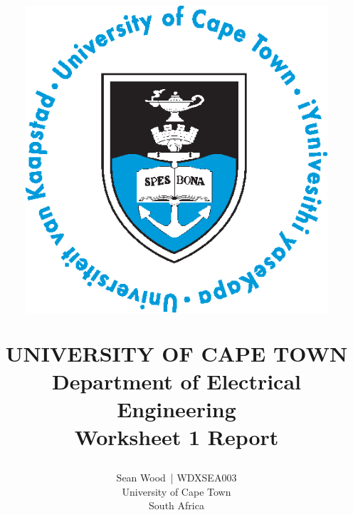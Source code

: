 

\newcommand{\mainauthor}{Sean Wood}
\newcommand{\mainauthoradditional}{WDXSEA003}
\newcommand{\reporttitle}{Worksheet 1 Report}
\newcommand{\coursecode}{EEE4096F}

\title{%
  \begin{figure}[H]
    \vspace{2cm}
    \begin{center}
      \includegraphics[width=0.4\columnwidth]{Preamble/uct-logo}
    \end{center}
  \end{figure}
  \textmd{\Huge UNIVERSITY OF CAPE TOWN \\ \LARGE Department of Electrical Engineering} \\
  \vspace{3cm}
  \reporttitle
}

\author{%
  \mainauthor\ | \mainauthoradditional\\
  University of Cape Town\\
  South Africa\\
}


\begin{sloppypar}

\maketitle
\newpage

\thispagestyle{fancy}
\pagestyle{fancy}

\frontmatter
{}

\newpage

\tableofcontents

\mainmatter





\end{sloppypar}

